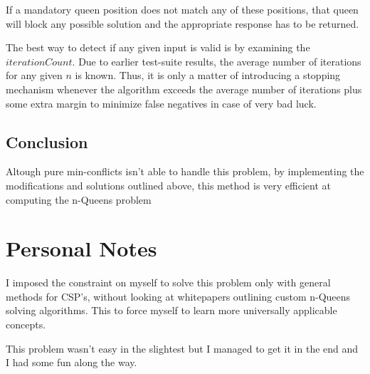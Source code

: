 \documentclass{article}
\begin{document}
If a mandatory queen position does not match any of these positions, that queen will block any possible solution and the appropriate response has to be returned.

The best way to detect if any given input is valid is by examining the \(iterationCount\).
Due to earlier test-suite results, the average number of iterations for any given \(n\) is known.
Thus, it is only a matter of introducing a stopping mechanism whenever the algorithm exceeds the average number of iterations
plus some extra margin to minimize false negatives in case of very bad luck.

\subsection{Conclusion}
Altough pure min-conflicts isn't able to handle this problem, by implementing the modifications and solutions outlined above,
this method is very efficient at computing the n-Queens problem

\section{Personal Notes}
I imposed the constraint on myself to solve this problem only with general methods for CSP's,
without looking at whitepapers outlining custom n-Queens solving algorithms. This to force
myself to learn more universally applicable concepts.

This problem wasn't easy in the slightest but I managed to get it in the end and I had some fun along the way.
\end{document}
